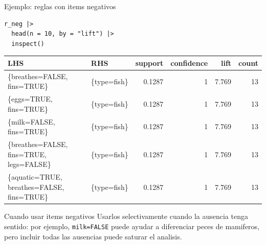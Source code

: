 \documentclass[10pt,aspectratio=169]{beamer}
\begin{document}
\begin{frame}[fragile]{Ejemplo: reglas con items negativos}
\begin{lstlisting}[style=rcode]
r_neg |>
  head(n = 10, by = "lift") |>
  inspect()
\end{lstlisting}

\scriptsize
\begin{tabular}{llrrrr}
\toprule
LHS & RHS & support & confidence & lift & count \\
\midrule
\{breathes=FALSE, fins=TRUE\} & \{type=fish\} & 0.1287 & 1 & 7.769 & 13 \\
\{eggs=TRUE, fins=TRUE\} & \{type=fish\} & 0.1287 & 1 & 7.769 & 13 \\
\{milk=FALSE, fins=TRUE\} & \{type=fish\} & 0.1287 & 1 & 7.769 & 13 \\
\{breathes=FALSE, fins=TRUE, legs=FALSE\} & \{type=fish\} & 0.1287 & 1 & 7.769 & 13 \\
\{aquatic=TRUE, breathes=FALSE, fins=TRUE\} & \{type=fish\} & 0.1287 & 1 & 7.769 & 13 \\
\bottomrule
\end{tabular}

\begin{block}{Cuando usar items negativos}
Usarlos selectivamente cuando la ausencia tenga sentido: por ejemplo, \texttt{milk=FALSE} puede ayudar a diferenciar peces de mamiferos, pero incluir todas las ausencias puede saturar el analisis.
\end{block}
\end{frame}

\end{document}
